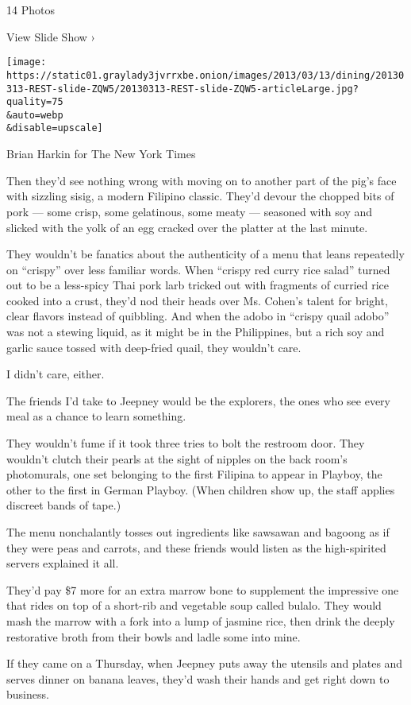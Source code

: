 14 Photos

View Slide Show ›

\texttt{[image: https://static01.graylady3jvrrxbe.onion/images/2013/03/13/dining/20130313-REST-slide-ZQW5/20130313-REST-slide-ZQW5-articleLarge.jpg?quality=75\\\&auto=webp\\\&disable=upscale]}

Brian Harkin for The New York Times

Then they'd see nothing wrong with moving on to another part of the
pig's face with sizzling sisig, a modern Filipino classic. They'd devour
the chopped bits of pork --- some crisp, some gelatinous, some meaty ---
seasoned with soy and slicked with the yolk of an egg cracked over the
platter at the last minute.

They wouldn't be fanatics about the authenticity of a menu that leans
repeatedly on ``crispy'' over less familiar words. When ``crispy red
curry rice salad'' turned out to be a less-spicy Thai pork larb tricked
out with fragments of curried rice cooked into a crust, they'd nod their
heads over Ms. Cohen's talent for bright, clear flavors instead of
quibbling. And when the adobo in ``crispy quail adobo'' was not a
stewing liquid, as it might be in the Philippines, but a rich soy and
garlic sauce tossed with deep-fried quail, they wouldn't care.

I didn't care, either.

The friends I'd take to Jeepney would be the explorers, the ones who see
every meal as a chance to learn something.

They wouldn't fume if it took three tries to bolt the restroom door.
They wouldn't clutch their pearls at the sight of nipples on the back
room's photomurals, one set belonging to the first Filipina to appear in
Playboy, the other to the first in German Playboy. (When children show
up, the staff applies discreet bands of tape.)

The menu nonchalantly tosses out ingredients like sawsawan and bagoong
as if they were peas and carrots, and these friends would listen as the
high-spirited servers explained it all.

They'd pay \$7 more for an extra marrow bone to supplement the
impressive one that rides on top of a short-rib and vegetable soup
called bulalo. They would mash the marrow with a fork into a lump of
jasmine rice, then drink the deeply restorative broth from their bowls
and ladle some into mine.

If they came on a Thursday, when Jeepney puts away the utensils and
plates and serves dinner on banana leaves, they'd wash their hands and
get right down to business.

